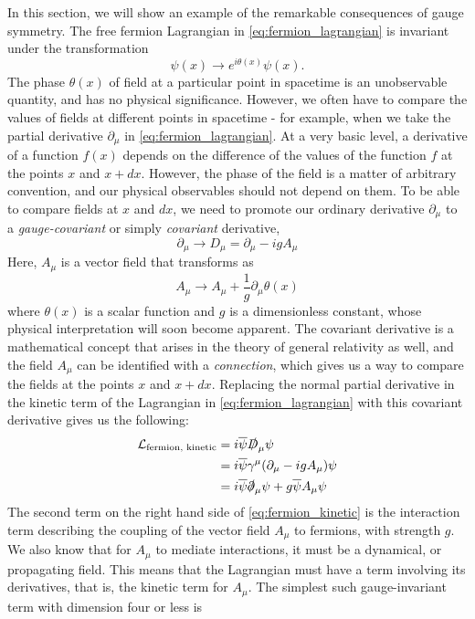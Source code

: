  In this section, we will show an example of the remarkable consequences of gauge symmetry. The free fermion Lagrangian in \eqref{eq:fermion_lagrangian} is invariant under the transformation
\begin{equation}\label{eq:fermion_field_transformation}
  \psi(x)\rightarrow e^{i\theta(x)}\psi(x).
\end{equation}
The phase $\theta(x)$ of field at a particular point in spacetime is an unobservable quantity, and has no physical significance. However, we often have to compare the values of fields at different points in spacetime - for example, when we take the partial derivative $\partial_\mu$ in \eqref{eq:fermion_lagrangian}. At a very basic level, a derivative of a function $f(x)$ depends on the difference of the values of the function $f$ at the points $x$ and $x + dx$. However, the phase of the field is a matter of arbitrary convention, and our physical observables should not depend on them. To be able to compare fields at $x$ and $dx$, we need to promote our ordinary derivative $\partial_\mu$ to a \emph{gauge-covariant} or simply \emph{covariant} derivative,
$$\partial_\mu \rightarrow D_\mu = \partial_\mu - igA_\mu$$
Here, $A_\mu$ is a vector field that transforms as%
%
$$A_\mu\rightarrow A_\mu + \frac{1}{g}\partial_\mu\theta(x)$$
%
where $\theta(x)$ is a scalar function and $g$ is a dimensionless constant, whose physical interpretation will soon become apparent. The covariant derivative is a mathematical concept that arises in the theory of general relativity as well, and the field $A_\mu$ can be identified with a \emph{connection}, which gives us a way to compare the fields at the points $x$ and $x + dx$.
Replacing the normal partial derivative in the kinetic term of the Lagrangian in \eqref{eq:fermion_lagrangian} with this covariant derivative gives us the following: 
\begin{equation}\label{eq:fermion_kinetic}
    \begin{split}
  \mathcal{L}_\text{fermion, kinetic} &= i\overline{\psi}\slashed{D}_\mu\psi\\
&= i\overline{\psi}\gamma^\mu(\partial_\mu-igA_\mu)\psi\\
&= i\overline{\psi}\slashed{\partial}_\mu\psi + g\overline{\psi}A_\mu\psi
\end{split}
\end{equation}
The second term on the right hand side of \eqref{eq:fermion_kinetic} is the interaction term describing the coupling of the vector field $A_\mu$ to fermions, with strength $g$. We also know that for $A_\mu$ to mediate interactions, it must be a dynamical, or propagating field. This means that the Lagrangian must have a term involving its derivatives, that is, the kinetic term for $A_\mu$. The simplest such gauge-invariant term with dimension four or less is %
